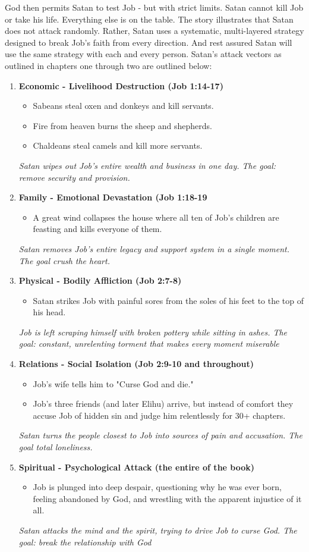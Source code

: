 \documentclass[12pt,a4paper]{book}
\begin{document}
God then permits Satan to test Job - but with strict limits.  Satan cannot kill Job or take his life.  Everything else is on the table.  The story illustrates that Satan does not attack randomly.  Rather, Satan uses a systematic, multi-layered strategy designed to break Job's faith from every direction.  And rest assured Satan will use the same strategy with each and every person.  Satan's attack vectors as outlined in chapters one through two are outlined below:
\newpage
\begin{enumerate}
\item \textbf{Economic - Livelihood Destruction (Job 1:14-17)}
\begin{itemize}
\item Sabeans steal oxen and donkeys and kill servants.
\item Fire from heaven burns the sheep and shepherds.
\item Chaldeans steal camels and kill more servants.
\end{itemize}
\textit{Satan wipes out Job's entire wealth and business in one day.  The goal: remove security and provision.}
\item \textbf{Family - Emotional Devastation (Job 1:18-19}
\begin{itemize}
\item A great wind collapses the house where all ten of Job's children are feasting and kills everyone of them.
\end{itemize}
\textit{Satan removes Job's entire legacy and support system in a single moment.  The goal crush the heart.}
\item \textbf{Physical - Bodily Affliction (Job 2:7-8)}
\begin{itemize}
\item Satan strikes Job with painful sores from the soles of his feet to the top of his head. 
\end{itemize}
\textit{Job is left scraping himself with broken pottery while sitting in ashes.  The goal: constant, unrelenting torment that makes every moment miserable}
\item \textbf{Relations - Social Isolation (Job 2:9-10 and throughout)}
\begin{itemize}
\item Job's wife tells him to "Curse God and die."
\item Job's three friends (and later Elihu) arrive, but instead of comfort they accuse Job of hidden sin and judge him relentlessly for 30+ chapters.
\end{itemize}
\textit{Satan turns the people closest to Job into sources of pain and accusation.  The goal total loneliness.}
\item \textbf{Spiritual - Psychological Attack (the entire of the book)}
\begin{itemize}
\item Job is plunged into deep despair, questioning why he was ever born, feeling abandoned by God, and wrestling with the apparent injustice of it all.
\end{itemize}
\textit{Satan attacks the mind and the spirit, trying to drive Job to curse God.  The goal: break the relationship with God}


\end{enumerate}
\end{document}
